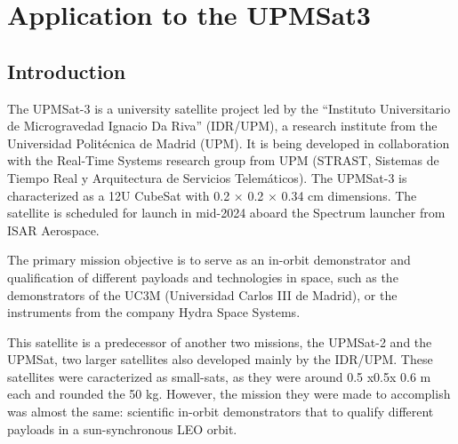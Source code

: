 \chapter{Application to the UPMSat3}\label{ch:04}
\section{Introduction}

The UPMSat-3 is a university satellite project led by the “Instituto Universitario de Microgravedad  Ignacio Da Riva” (IDR/UPM), a research institute from the Universidad Politécnica de Madrid (UPM). It is being developed in collaboration with the Real-Time Systems research group from UPM (STRAST, Sistemas de Tiempo Real y Arquitectura de Servicios Telemáticos). The UPMSat-3 is characterized as a 12U CubeSat with 0.2 × 0.2 × 0.34 cm dimensions. The satellite is scheduled for launch in mid-2024 aboard the Spectrum launcher from ISAR Aerospace. 

The primary mission objective is to serve as an in-orbit demonstrator and qualification of
different payloads and technologies in space, such as the demonstrators of the UC3M (Universidad Carlos III de Madrid), or the instruments from the company Hydra Space Systems.

This satellite is a predecessor of another two missions, the UPMSat-2 and the UPMSat, two larger satellites also developed mainly by the IDR/UPM. These satellites were caracterized as small-sats, as they were around 0.5 x0.5x 0.6 m each and rounded the 50 kg. However, the mission they were made to accomplish was almost the same: scientific in-orbit demonstrators that to qualify different payloads in a sun-synchronous LEO orbit.



